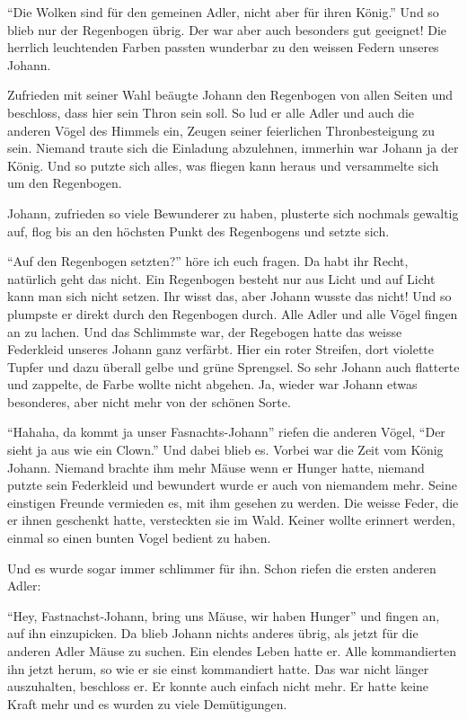 \enquote{Die Wolken sind für den gemeinen Adler, nicht aber für ihren König.} Und so blieb nur der Regenbogen übrig. Der war aber auch besonders gut geeignet! Die herrlich leuchtenden Farben passten wunderbar zu den weissen Federn unseres Johann. 

Zufrieden mit seiner Wahl beäugte Johann den Regenbogen von allen Seiten und beschloss, dass hier sein Thron sein soll. So lud er alle Adler und auch die anderen Vögel des Himmels ein, Zeugen seiner feierlichen Thronbesteigung zu sein. Niemand traute sich die Einladung abzulehnen, immerhin war Johann ja der König. Und so putzte sich alles, was fliegen kann heraus und versammelte sich um den Regenbogen.

Johann, zufrieden so viele Bewunderer zu haben, plusterte sich nochmals gewaltig auf, flog bis an den höchsten Punkt des Regenbogens und setzte sich.

\enquote{Auf den Regenbogen setzten?} höre ich euch fragen. Da habt ihr Recht, natürlich geht das nicht. Ein Regenbogen besteht nur aus Licht und auf Licht kann man sich nicht setzen. Ihr wisst das, aber Johann wusste das nicht! Und so plumpste er direkt durch den Regenbogen durch. Alle Adler und alle Vögel fingen an zu lachen. Und das Schlimmste war, der Regebogen hatte das weisse Federkleid unseres Johann ganz verfärbt. Hier ein roter Streifen, dort violette Tupfer und dazu überall gelbe und grüne Sprengsel. So sehr Johann auch flatterte und zappelte, de Farbe wollte nicht abgehen. Ja, wieder war Johann etwas besonderes, aber nicht mehr von der schönen Sorte.

\enquote{Hahaha, da kommt ja unser Fasnachts-Johann} riefen die anderen Vögel, \enquote{Der sieht ja aus wie ein Clown.} Und dabei blieb es. Vorbei war die Zeit vom König Johann. Niemand brachte ihm mehr Mäuse wenn er Hunger hatte, niemand putzte sein Federkleid und bewundert wurde er auch von niemandem mehr. Seine einstigen Freunde vermieden es, mit ihm gesehen zu werden. Die weisse Feder, die er ihnen geschenkt hatte, versteckten sie im Wald. Keiner wollte erinnert werden, einmal so einen bunten Vogel bedient zu haben. 

Und es wurde sogar immer schlimmer für ihn. Schon riefen die ersten anderen Adler:

\enquote{Hey, Fastnachst-Johann, bring uns Mäuse, wir haben Hunger} und fingen an, auf ihn einzupicken. Da blieb Johann nichts anderes übrig, als jetzt für die anderen Adler Mäuse zu suchen. Ein elendes Leben hatte er. Alle kommandierten ihn jetzt herum, so wie er sie einst kommandiert hatte. Das war nicht länger auszuhalten, beschloss er. Er konnte auch einfach nicht mehr. Er hatte keine Kraft mehr und es wurden zu viele Demütigungen.

